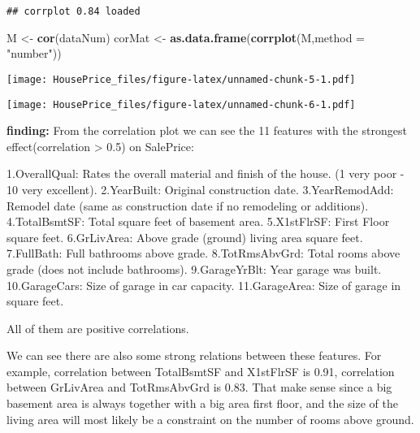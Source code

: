 \documentclass[]{article}
\newenvironment{Shaded}{\begin{snugshade}}{\end{snugshade}}
\newcommand{\KeywordTok}[1]{\textcolor[rgb]{0.13,0.29,0.53}{\textbf{#1}}}
\newcommand{\DataTypeTok}[1]{\textcolor[rgb]{0.13,0.29,0.53}{#1}}
\newcommand{\FloatTok}[1]{\textcolor[rgb]{0.00,0.00,0.81}{#1}}
\newcommand{\StringTok}[1]{\textcolor[rgb]{0.31,0.60,0.02}{#1}}
\newcommand{\OperatorTok}[1]{\textcolor[rgb]{0.81,0.36,0.00}{\textbf{#1}}}
\newcommand{\NormalTok}[1]{#1}
\begin{document}
\begin{verbatim}
## corrplot 0.84 loaded
\end{verbatim}

\begin{Shaded}
\begin{Highlighting}[]
\NormalTok{M <-}\StringTok{ }\KeywordTok{cor}\NormalTok{(dataNum)}
\NormalTok{corMat <-}\StringTok{ }\KeywordTok{as.data.frame}\NormalTok{(}\KeywordTok{corrplot}\NormalTok{(M,}\DataTypeTok{method =} \StringTok{"number"}\NormalTok{))}
\end{Highlighting}
\end{Shaded}

\texttt{[image: HousePrice\_files/figure-latex/unnamed-chunk-5-1.pdf]}

\begin{Shaded}
\end{Shaded}

\texttt{[image: HousePrice\_files/figure-latex/unnamed-chunk-6-1.pdf]}

\textbf{finding:} From the correlation plot we can see the 11 features
with the strongest effect(correlation \textgreater{} 0.5) on SalePrice:

1.OverallQual: Rates the overall material and finish of the house. (1
very poor - 10 very excellent). 2.YearBuilt: Original construction date.
3.YearRemodAdd: Remodel date (same as construction date if no remodeling
or additions). 4.TotalBsmtSF: Total square feet of basement area.
5.X1stFlrSF: First Floor square feet. 6.GrLivArea: Above grade (ground)
living area square feet. 7.FullBath: Full bathrooms above grade.
8.TotRmsAbvGrd: Total rooms above grade (does not include bathrooms).
9.GarageYrBlt: Year garage was built. 10.GarageCars: Size of garage in
car capacity. 11.GarageArea: Size of garage in square feet.

All of them are positive correlations.

We can see there are also some strong relations between these features.
For example, correlation between TotalBsmtSF and X1stFlrSF is 0.91,
correlation between GrLivArea and TotRmsAbvGrd is 0.83. That make sense
since a big basement area is always together with a big area first
floor, and the size of the living area will most likely be a constraint
on the number of rooms above ground.
\end{document}
